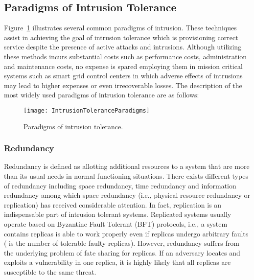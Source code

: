 \documentclass[preprint,number,12pt]{elsarticle}
\begin{document}
\subsection{Paradigms of Intrusion Tolerance}
Figure~\ref{fig:IntrusionToleranceParadigms} illustrates several common paradigms of intrusion. These techniques assist in achieving the goal of intrusion tolerance which is provisioning correct service despite the presence of active attacks and intrusions. Although utilizing these methods incurs substantial costs such as performance costs, administration and maintenance costs, no expense is spared employing them in mission critical systems such as smart grid control centers in which adverse effects of intrusions may lead to higher expenses or even irrecoverable losses. The description of the most widely used paradigms of intrusion tolerance are as follows:
\begin{figure}[!t]
\centering
\texttt{[image: IntrusionToleranceParadigms]}
\caption{Paradigms of intrusion tolerance.}
\label{fig:IntrusionToleranceParadigms}
\end{figure}
\subsubsection{Redundancy}
Redundancy is defined as allotting additional resources to a system that are more than its usual needs in normal functioning situations. There exists different types of redundancy including space redundancy, time redundancy and information redundancy among which space redundancy (i.e., physical resource redundancy or replication) has received considerable attention. In fact, replication is an indispensable part of intrusion tolerant systems. Replicated systems usually operate based on Byzantine Fault Tolerant (BFT) protocols, i.e., a system contains  replicas is able to work properly even if  replicas undergo arbitrary faults ( is the number of tolerable faulty replicas)\citep{Bessani2011a}. However, redundancy suffers from the underlying problem of fate sharing for replicas\citep{Sterbenz20101245,Wang2003b}. If an adversary locates and exploits a vulnerability in one replica, it is highly likely that all replicas are susceptible to the same threat.
\end{document}
